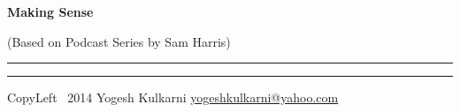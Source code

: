 

\usepackage{beamerarticle} %



\begin{center}
     \Large{\textbf{Making Sense}}  %
		 
		 {\tiny (Based on Podcast Series by Sam Harris)}
\end{center}
\rule{\linewidth}{0.25pt}
\raggedright
\footnotesize
\begin{multicols}{3}




\rule{0.3\linewidth}{0.25pt}

\scriptsize
CopyLeft \textcopyleft\ 2014 Yogesh Kulkarni
\href{http://www.yogeshkulkarni.com}{yogeshkulkarni@yahoo.com}

\end{multicols}


